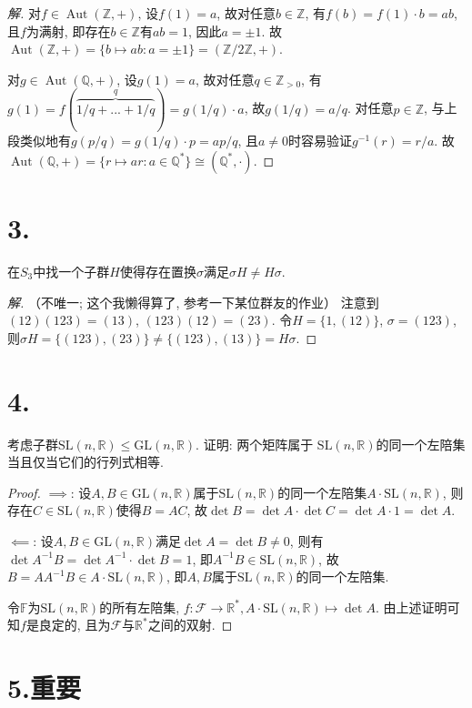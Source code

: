 \documentclass[12pt, a4paper, fontset=windows]{ctexart}
\newcommand{\F}{\mathbb{F}}
\newcommand{\Q}{\mathbb{Q}}
\newcommand{\R}{\mathbb{R}}
\newcommand{\Z}{\mathbb{Z}}
\newcommand{\Aut}{\operatorname{Aut}}
\newcommand{\GL}{\mathrm{GL}}
\newcommand{\SL}{\mathrm{SL}}
\newcommand{\isom}{\cong} %
\newcommand{\kh}[1]{（{#1}）} %
\newenvironment{solution}{\begin{proof}[解]}{\end{proof}}
\begin{document}
\begin{solution}
对$f\in\Aut(\Z,+)$, 设$f(1)=a$, 故对任意$b\in\Z$, 有$f(b)=f(1)\cdot b=ab$, 
且$f$为满射, 即存在$b\in\Z$有$ab=1$, 因此$a=\pm 1$. 故$\Aut(\Z,+)=\{b\mapsto ab:a=\pm 1\}=(\Z/2\Z,+)$. 

对$g\in\Aut(\Q,+)$, 设$g(1)=a$, 故对任意$q\in\Z_{>0}$, 有$g(1)=f(\overbrace{1/q+...+1/q}^q)=g(1/q)\cdot a$, 
故$g(1/q)=a/q$. 对任意$p\in\Z$, 与上段类似地有$g(p/q)=g(1/q)\cdot p=ap/q$, 且$a\ne 0$时容易验证$g^{-1}(r)=r/a$. 
故$\Aut(\Q,+)=\{r\mapsto ar:a\in\Q^*\}\isom(\Q^*,\cdot)$. 
\end{solution}

\section*{3.}

在$S_3$中找一个子群$H$使得存在置换$\sigma$满足$\sigma H\ne H\sigma$. 

\begin{solution}
\kh{不唯一; 这个我懒得算了, 参考一下某位群友的作业} 
注意到$(12)(123)=(13)$, $(123)(12)=(23)$. 令$H=\{1,(12)\}$, 
$\sigma=(123)$, 则$\sigma H=\{(123),(23)\}\ne\{(123),(13)\}=H\sigma$. 
\end{solution}

\section*{4.}
\label{GL-SL}

考虑子群$\SL(n,\R)\le\GL(n,\R)$. 证明: 两个矩阵属于
$\SL(n,\R)$的同一个左陪集当且仅当它们的行列式相等. 

\begin{proof}
$\implies$: 
设$A,B\in\GL(n,\R)$属于$\SL(n,\R)$的同一个左陪集$A\cdot\SL(n,\R)$, 
则存在$C\in\SL(n,\R)$使得$B=AC$, 故$\det B=\det A\cdot\det C=\det A\cdot 1=\det A$. 

$\impliedby$: 
设$A,B\in\GL(n,\R)$满足$\det A=\det B\ne 0$, 则有$\det A^{-1}B=\det A^{-1}\cdot\det B=1$, 
即$A^{-1}B\in\SL(n,\R)$, 故$B=AA^{-1}B\in A\cdot\SL(n,\R)$, 
即$A,B$属于$\SL(n,\R)$的同一个左陪集. 

令$\F$为$\SL(n,\R)$的所有左陪集, $f:\mathcal{F}\to\R^*,A\cdot\SL(n,\R)\mapsto\det A$. 
由上述证明可知$f$是良定的, 且为$\mathcal{F}$与$\R^*$之间的双射. 
\end{proof}

\section*{5.\normalsize 重要}
\end{document}
